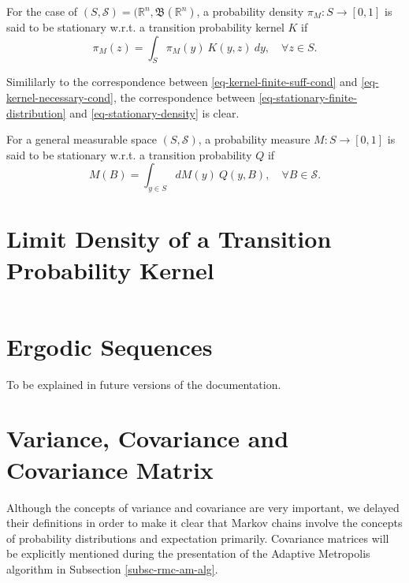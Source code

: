 For the case of $(S,\mathcal{S})=(\mathbb{R}^n,\mathfrak{B}(\mathbb{R}^n)$,
a probability density $\pi_M:S\rightarrow [0,1]$ is said to be stationary w.r.t. a transition probability kernel $K$ if
\begin{equation}\label{eq-stationary-density}
\pi_M(z) = \int_{S}\pi_M(y)~K(y,z)~dy,\quad\forall z\in S.
\end{equation}

Simililarly to the correspondence between \eqref{eq-kernel-finite-suff-cond} and \eqref{eq-kernel-necessary-cond},
the correspondence between \eqref{eq-stationary-finite-distribution} and \eqref{eq-stationary-density} is clear.

For a general measurable space $(S,\mathcal{S})$,
a probability measure $M:S\rightarrow [0,1]$ is said to be stationary w.r.t. a transition probability $Q$ if
\begin{equation*}
M(B) = \int_{y\in S}dM(y)~Q(y,B),\quad\forall B\in\mathcal{S}.
\end{equation*}

\section{Limit Density of a Transition Probability Kernel}
$~$\\

\section{Ergodic Sequences}

To be explained in future versions of the documentation.

\section{Variance, Covariance and Covariance Matrix}

Although the concepts of variance and covariance are very important, we delayed their definitions in order to make it clear that Markov chains involve the concepts of probability distributions and expectation primarily.
Covariance matrices will be explicitly mentioned during the presentation of the Adaptive Metropolis algorithm in Subsection \ref{subsc-rmc-am-alg}.

